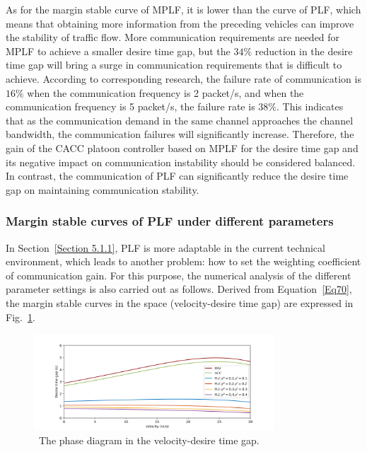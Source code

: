 \documentclass[journal]{IEEEtran}
\begin{document}
As for the margin stable curve of MPLF, it is lower than the curve of PLF, which means that obtaining more information from the preceding vehicles can improve the stability of traffic flow. More communication requirements are needed for MPLF to achieve a smaller desire time gap, but the $34\%$ reduction in the desire time gap will bring a surge in communication requirements that is difficult to achieve. According to corresponding research\citep{hafeez2013performance}, the failure rate of communication is $16\%$ when the communication frequency is 2 packet/s, and when the communication frequency is 5 packet/s, the failure rate is $38\%$. This indicates that as the communication demand in the same channel approaches the channel bandwidth, the communication failures will significantly increase. Therefore, the gain of the CACC platoon controller based on MPLF for the desire time gap and its negative impact on communication instability should be considered balanced. In contrast, the communication of PLF can significantly reduce the desire time gap on maintaining communication stability.


\subsubsection{Margin stable curves of PLF under different parameters}
\label{Section 5.1.2}
In Section~\ref{Section 5.1.1}, PLF is more adaptable in the current technical environment, which leads to another problem: how to set the weighting coefficient of communication gain. For this purpose, the numerical analysis of the different parameter settings is also carried out as follows. Derived from Equation~\ref{Eq70}, the margin stable curves in the space (velocity-desire time gap) are expressed in Fig.~\ref{Figure4}.

\begin{figure}
\includegraphics[width=9cm]{fig4.png}
\caption{~The phase diagram in the velocity-desire time gap.} 
\label{Figure4}
\end{figure}
\end{document}
